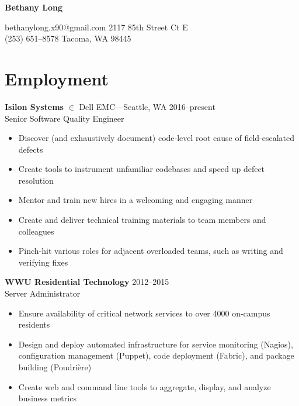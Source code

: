 \documentclass[11pt, letterpaper]{article}
\begin{document}
\clearpage
\thispagestyle{empty}

\begin{center}
\textbf{\huge{Bethany Long}}%
\end{center}

\small{
bethanylong.x90@gmail.com \hfill 2117 85th Street Ct E\\
(253) 651--8578 \hfill Tacoma, WA 98445}

\hrulefill

\section*{Employment}

\textbf{Isilon Systems} \(\in\) Dell EMC---Seattle, WA \hfill 2016--present\\
Senior Software Quality Engineer

\begin{itemize}
    \item Discover (and exhaustively document) code-level root cause of field-escalated defects
    \item Create tools to instrument unfamiliar codebases and speed up defect resolution
    \item Mentor and train new hires in a welcoming and engaging manner
    \item Create and deliver technical training materials to team members and colleagues
    \item Pinch-hit various roles for adjacent overloaded teams, such as writing and verifying fixes
\end{itemize}

\bigskip

\textbf{WWU Residential Technology} \hfill 2012--2015\\
Server Administrator

\begin{itemize}
    \item Ensure availability of critical network services to over 4000 on-campus residents
    \item Design and deploy automated infrastructure for service monitoring (Nagios), configuration management (Puppet), code deployment (Fabric), and package building (Poudri\`{e}re)
    \item Create web and command line tools to aggregate, display, and analyze business metrics
\end{itemize}

\bigskip
\end{document}
